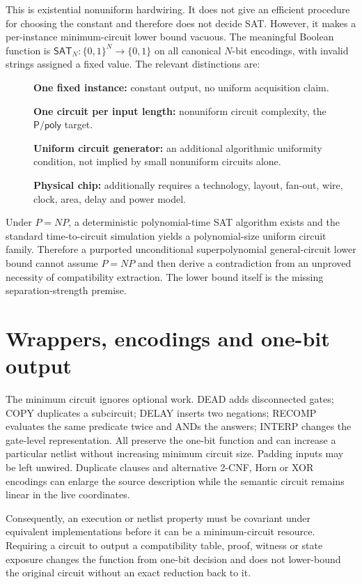 \documentclass[11pt]{article}
\newcommand{\SAT}{\mathsf{SAT}}
\begin{document}
This is existential nonuniform hardwiring.  It does not give an efficient
procedure for choosing the constant and therefore does not decide SAT.
However, it makes a per-instance minimum-circuit lower bound vacuous.  The
meaningful Boolean function is $\SAT_N:\{0,1\}^N\to\{0,1\}$ on all
canonical $N$-bit encodings, with invalid strings assigned a fixed value.
The relevant distinctions are:
\begin{description}
\item[] \textbf{One fixed instance:} constant output, no uniform acquisition
claim.
\item[] \textbf{One circuit per input length:} nonuniform circuit complexity,
the $\mathsf{P/poly}$ target.
\item[] \textbf{Uniform circuit generator:} an additional algorithmic
uniformity condition, not implied by small nonuniform circuits alone.
\item[] \textbf{Physical chip:} additionally requires a technology, layout,
fan-out, wire, clock, area, delay and power model.
\end{description}

Under $P=NP$, a deterministic polynomial-time SAT algorithm exists and the
standard time-to-circuit simulation yields a polynomial-size uniform circuit
family.  Therefore a purported unconditional superpolynomial general-circuit
lower bound cannot assume $P=NP$ and then derive a contradiction from an
unproved necessity of compatibility extraction.  The lower bound itself is
the missing separation-strength premise.

\section{Wrappers, encodings and one-bit output}
The minimum circuit ignores optional work.  DEAD adds disconnected gates;
COPY duplicates a subcircuit; DELAY inserts two negations; RECOMP evaluates
the same predicate twice and ANDs the answers; INTERP changes the gate-level
representation.  All preserve the one-bit function and can increase a
particular netlist without increasing minimum circuit size.  Padding inputs
may be left unwired.  Duplicate clauses and alternative 2-CNF, Horn or XOR
encodings can enlarge the source description while the semantic circuit
remains linear in the live coordinates.

Consequently, an execution or netlist property must be covariant under
equivalent implementations before it can be a minimum-circuit resource.
Requiring a circuit to output a compatibility table, proof, witness or state
exposure changes the function from one-bit decision and does not lower-bound
the original circuit without an exact reduction back to it.
\end{document}
